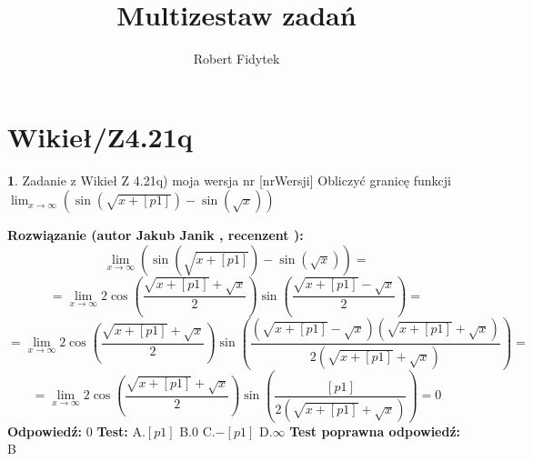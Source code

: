 \documentclass[12pt, a4paper]{article}
\title{Multizestaw zadań}
\author{Robert Fidytek}
\date{}
\theoremstyle{definition} %
\newtheorem{zad}{}
\newcommand{\kategoria}[1]{\section{#1}} %
\newcommand{\zadStart}[1]{\begin{zad}#1\newline} %
\newcommand{\zadStop}{\end{zad}}   %
\newcommand{\rozwStart}[2]{\noindent \textbf{Rozwiązanie (autor #1 , recenzent #2): }\newline} %
\newcommand{\odpStart}{\noindent \textbf{Odpowiedź:}\newline}    %
\newcommand{\odpStop}{\newline}                                             %
\newcommand{\testStart}{\noindent \textbf{Test:}\newline} %
\newcommand{\testStop}{\newline} %
\newcommand{\kluczStart}{\noindent \textbf{Test poprawna odpowiedź:}\newline} %
\newcommand{\kluczStop}{\newline} %
\begin{document}
\maketitle


\kategoria{Wikieł/Z4.21q}
\zadStart{Zadanie z Wikieł Z 4.21q) moja wersja nr [nrWersji]}
Obliczyć granicę funkcji $\lim_{x \to \infty} (\sin{(\sqrt{x+[p1]})}-\sin{(\sqrt{x})})$
\zadStop
\rozwStart{Jakub Janik}{}
$$\lim_{x \to \infty} (\sin{(\sqrt{x+[p1]})}-\sin{(\sqrt{x})})=$$
$$=\lim_{x \to \infty} 2\cos{(\frac{\sqrt{x+[p1]}+\sqrt{x}}{2})}\sin{(\frac{\sqrt{x+[p1]}-\sqrt{x}}{2})}=$$
$$=\lim_{x \to \infty} 2\cos{(\frac{\sqrt{x+[p1]}+\sqrt{x}}{2})}\sin{(\frac{(\sqrt{x+[p1]}-\sqrt{x})(\sqrt{x+[p1]}+\sqrt{x})}{2(\sqrt{x+[p1]}+\sqrt{x})})}=$$
$$=\lim_{x \to \infty} 2\cos{(\frac{\sqrt{x+[p1]}+\sqrt{x}}{2})}\sin{(\frac{[p1]}{2(\sqrt{x+[p1]}+\sqrt{x})})}=0$$
\odpStart
$0$
\odpStop
\testStart
A.$[p1]$
B.$0$
C.$-[p1]$
D.$\infty$
\testStop
\kluczStart
B
\kluczStop
\end{document}
